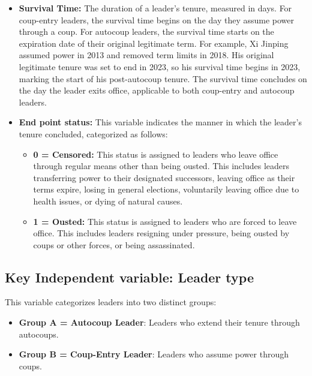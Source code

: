 \documentclass[
  12pt,
]{report}
\providecommand{\tightlist}{%
  \setlength{\itemsep}{0pt}\setlength{\parskip}{0pt}}\usepackage{longtable,booktabs,array}
\begin{document}
\begin{itemize}
\item
  \textbf{Survival Time:} The duration of a leader's tenure, measured in
  days. For coup-entry leaders, the survival time begins on the day they
  assume power through a coup. For autocoup leaders, the survival time
  starts on the expiration date of their original legitimate term. For
  example, Xi Jinping assumed power in 2013 and removed term limits in
  2018. His original legitimate tenure was set to end in 2023, so his
  survival time begins in 2023, marking the start of his post-autocoup
  tenure. The survival time concludes on the day the leader exits
  office, applicable to both coup-entry and autocoup leaders.
\item
  \textbf{End point status:} This variable indicates the manner in which
  the leader's tenure concluded, categorized as follows:

  \begin{itemize}
  \item
    \textbf{0 = Censored:} This status is assigned to leaders who leave
    office through regular means other than being ousted. This includes
    leaders transferring power to their designated successors, leaving
    office as their terms expire, losing in general elections,
    voluntarily leaving office due to health issues, or dying of natural
    causes.
  \item
    \textbf{1 = Ousted:} This status is assigned to leaders who are
    forced to leave office. This includes leaders resigning under
    pressure, being ousted by coups or other forces, or being
    assassinated.
  \end{itemize}
\end{itemize}

\subsection{Key Independent variable: Leader
type}\label{key-independent-variable-leader-type}

This variable categorizes leaders into two distinct groups:

\begin{itemize}
\tightlist
\item
  \textbf{Group A = Autocoup Leader}: Leaders who extend their tenure
  through autocoups.
\item
  \textbf{Group B = Coup-Entry Leader}: Leaders who assume power through
  coups.
\end{itemize}
\end{document}
